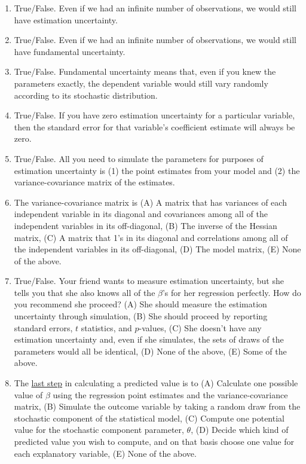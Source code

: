 \documentclass[11pt]{article}
\begin{document}
\begin{enumerate}
\item True/False.  Even if we had an infinite number of observations, we would still have estimation uncertainty. 
\item True/False.  Even if we had an infinite number of observations, we would still have fundamental uncertainty. 
\item True/False. Fundamental uncertainty means that, even if you knew the parameters exactly, the dependent variable would still vary randomly according to its stochastic distribution. 
\item True/False. If you have zero estimation uncertainty for a particular variable, then the standard error for that variable's coefficient estimate will always be zero. 
\item True/False. All you need to simulate the parameters for purposes of estimation uncertainty is (1) the point estimates from your model and (2) the variance-covariance matrix of the estimates. 
\item The variance-covariance matrix is (A) A matrix that has variances of each independent variable in its diagonal and covariances among all of the independent variables in its off-diagonal, (B) The inverse of the Hessian matrix, (C) A matrix that 1's in its diagonal and correlations among all of the independent variables in its off-diagonal, (D) The model matrix, (E) None of the above. 
\item True/False.  Your friend wants to measure estimation uncertainty, but she tells you that she also knows all of the $\beta$'s for her regression perfectly.  How do you recommend she proceed? (A) She should measure the estimation uncertainty through simulation, (B) She should proceed by reporting standard errors, $t$ statistics, and $p$-values, (C) She doesn't have any estimation uncertainty and, even if she simulates, the sets of draws of the parameters would all be identical, (D) None of the above, (E) Some of the above. 
\item The \underline{last step} in calculating a predicted value is to (A) Calculate one possible value of $\beta$ using the regression point estimates and the variance-covariance matrix, (B) Simulate the outcome variable by taking a random draw from the stochastic component of the statistical model, (C) Compute one potential value for the stochastic component parameter, $\theta$, (D) Decide which kind of predicted value you wish to compute, and on that basis choose one value for each explanatory variable, (E) None of the above. 

\end{enumerate}
\end{document}
